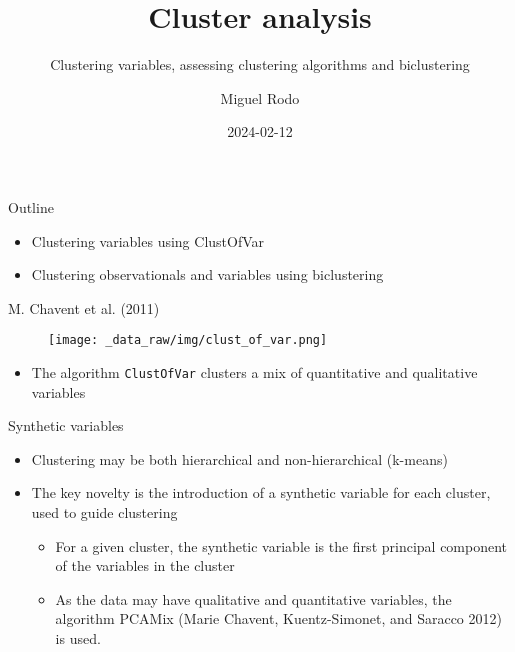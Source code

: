 \documentclass[
  ignorenonframetext,
  aspectratio=169,
]{beamer}
\title{Cluster analysis}
\subtitle{Clustering variables, assessing clustering algorithms and
biclustering}
\author{Miguel Rodo}
\date{2024-02-12}
\providecommand{\tightlist}{%
  \setlength{\itemsep}{0pt}\setlength{\parskip}{0pt}}\usepackage{longtable,booktabs,array}
\begin{document}
\frame{\titlepage}
\ifdefined\Shaded\renewenvironment{Shaded}{\begin{tcolorbox}[borderline west={3pt}{0pt}{shadecolor}, boxrule=0pt, interior hidden, enhanced, frame hidden, sharp corners, breakable]}{\end{tcolorbox}}\fi

\begin{frame}{Outline}
\protect\hypertarget{outline}{}
\begin{itemize}
\tightlist
\item
  Clustering variables using ClustOfVar
\item
  Clustering observationals and variables using biclustering
\end{itemize}
\end{frame}

\begin{frame}[fragile]{M. Chavent et al. (2011)}
\protect\hypertarget{chavent_etal11}{}
\begin{figure}[H]
\centering
\texttt{[image: \_data\_raw/img/clust\_of\_var.png]}
\end{figure}

\begin{itemize}
\tightlist
\item
  The algorithm \texttt{ClustOfVar} clusters a mix of quantitative and
  qualitative variables
\end{itemize}
\end{frame}

\begin{frame}{Synthetic variables}
\protect\hypertarget{synthetic-variables}{}
\begin{itemize}
\tightlist
\item
  Clustering may be both hierarchical and non-hierarchical (k-means)
\item
  The key novelty is the introduction of a synthetic variable for each
  cluster, used to guide clustering

  \begin{itemize}
  \tightlist
  \item
    For a given cluster, the synthetic variable is the first principal
    component of the variables in the cluster
  \item
    As the data may have qualitative and quantitative variables, the
    algorithm PCAMix (Marie Chavent, Kuentz-Simonet, and Saracco 2012)
    is used.
  \end{itemize}
\end{itemize}
\end{frame}
\end{document}

